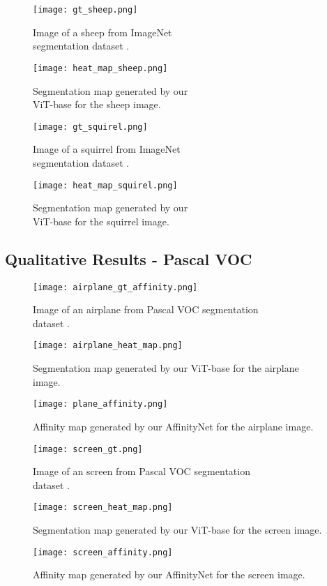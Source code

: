 \begin{figure}[H]
  \texttt{[image: gt\_sheep.png]}
  \caption{Image of a sheep from ImageNet \\segmentation dataset \cite{imagenet-seg}.}\label{fig:gt_sheep}
\endminipage\hfill
{}
  \texttt{[image: heat\_map\_sheep.png]}
  \caption{Segmentation map generated by our \\ViT-base for the sheep image.}\label{fig:map_sheep}
\endminipage\hfill
\end{figure}

\begin{figure}[H]
  \texttt{[image: gt\_squirel.png]}
  \caption{Image of a squirrel from ImageNet \\segmentation dataset \cite{imagenet-seg}.}\label{fig:gt_squirel}
\endminipage\hfill
{}
  \texttt{[image: heat\_map\_squirel.png]}
  \caption{Segmentation map generated by our \\ViT-base for the squirrel image.}\label{fig:map_squirel}
\endminipage\hfill
\end{figure}

\subsection*{Qualitative Results - Pascal VOC}
\label{Pascal_results}

\begin{figure}[H]
  \texttt{[image: airplane\_gt\_affinity.png]}
  \caption{Image of an airplane from Pascal VOC segmentation \\dataset \cite{ahn2018learning}.}
  \label{fig:plane_gt}
\endminipage\hfill
{}
  \texttt{[image: airplane\_heat\_map.png]}
  \caption{Segmentation map generated by our ViT-base for the airplane image.}
  \label{fig:phane_map}
\endminipage\hfill
{}%
  \texttt{[image: plane\_affinity.png]}
  \caption{Affinity map generated by our AffinityNet for the airplane image.}
  \label{fig:plane_aff}
\endminipage
\end{figure}

\begin{figure}[H]
  \texttt{[image: screen\_gt.png]}
  \caption{Image of an screen from Pascal VOC segmentation \\dataset \cite{ahn2018learning}.}
  \label{fig:screen_gt}
\endminipage\hfill
{}
  \texttt{[image: screen\_heat\_map.png]}
  \caption{Segmentation map generated by our ViT-base for the screen image.}
  \label{fig:screen_map}
\endminipage\hfill
{}%
  \texttt{[image: screen\_affinity.png]}
  \caption{Affinity map generated by our AffinityNet for the screen image.}
  \label{fig:screen_aff}
\endminipage
\end{figure}

